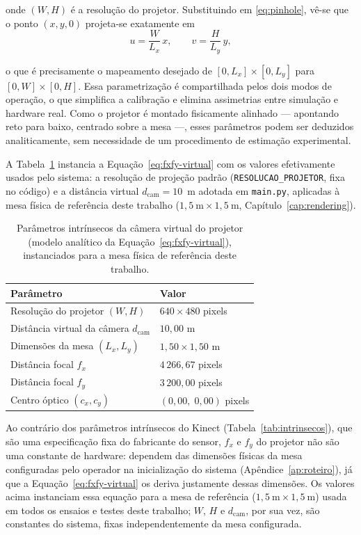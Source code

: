 \noindent onde $(W, H)$ é a resolução do projetor. Substituindo em
\eqref{eq:pinhole}, vê-se que o ponto $(x, y, 0)$ projeta-se exatamente
em
\begin{equation}
u = \frac{W}{L_x} \, x, \qquad v = \frac{H}{L_y} \, y,
\end{equation}

\noindent o que é precisamente o mapeamento desejado de
$[0, L_x] \times [0, L_y]$ para $[0, W] \times [0, H]$. Essa parametrização
é compartilhada pelos dois modos de operação, o que simplifica a
calibração e elimina assimetrias entre simulação e hardware real. Como
o projetor é montado fisicamente alinhado — apontando reto para baixo,
centrado sobre a mesa —, esses parâmetros podem ser deduzidos
analiticamente, sem necessidade de um procedimento de estimação
experimental.

A Tabela~\ref{tab:intrinsecos-projetor} instancia a
Equação~\eqref{eq:fxfy-virtual} com os valores efetivamente usados
pelo sistema: a resolução de projeção padrão
(\texttt{RESOLUCAO\_PROJETOR}, fixa no código) e a distância virtual
$d_{\text{cam}} = 10$~m adotada em \texttt{main.py}, aplicadas à mesa
física de referência deste trabalho ($1,5~\text{m} \times
1,5~\text{m}$, Capítulo~\ref{cap:rendering}).

\begin{table}[!ht]
\centering
\caption{Parâmetros intrínsecos da câmera virtual do projetor (modelo analítico da Equação~\eqref{eq:fxfy-virtual}), instanciados para a mesa física de referência deste trabalho.}
\label{tab:intrinsecos-projetor}
\begin{tabular}{ll}
\toprule
\textbf{Parâmetro} & \textbf{Valor} \\
\midrule
Resolução do projetor $(W, H)$          & $640 \times 480$ pixels \\
Distância virtual da câmera $d_{\text{cam}}$ & $10{,}00$ m \\
Dimensões da mesa $(L_x, L_y)$          & $1{,}50 \times 1{,}50$ m \\
Distância focal $f_x$                   & $4\,266{,}67$ pixels \\
Distância focal $f_y$                   & $3\,200{,}00$ pixels \\
Centro óptico $(c_x, c_y)$              & $(0{,}00,\; 0{,}00)$ pixels \\
\bottomrule
\end{tabular}
\end{table}

Ao contrário dos parâmetros intrínsecos do Kinect
(Tabela~\ref{tab:intrinsecos}), que são uma especificação fixa do
fabricante do sensor, $f_x$ e $f_y$ do projetor não são uma constante
de hardware: dependem das dimensões físicas da mesa configuradas pelo
operador na inicialização do sistema (Apêndice~\ref{ap:roteiro}), já
que a Equação~\eqref{eq:fxfy-virtual} os deriva justamente dessas
dimensões. Os valores acima instanciam essa equação para a mesa de
referência ($1,5~\text{m} \times 1,5~\text{m}$) usada em todos os
ensaios e testes deste trabalho; $W$, $H$ e $d_{\text{cam}}$, por sua
vez, são constantes do sistema, fixas independentemente da mesa
configurada.

